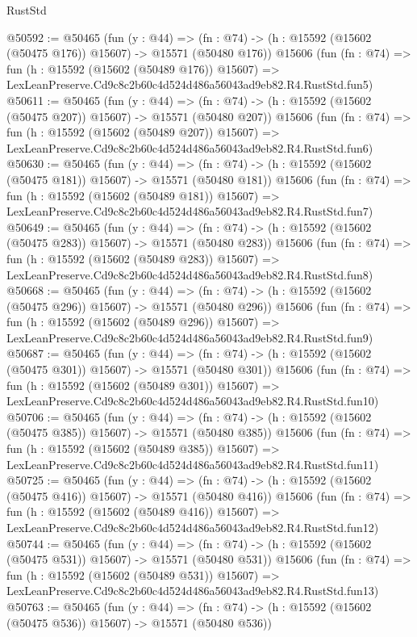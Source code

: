 \begin{lexlean}{RustStd}
\begin{coremodule}
@50592 := @50465
    (fun (y : @44) =>
    (fn : @74) -> (h : @15592 (@15602 (@50475 @176)) @15607) -> @15571 (@50480 @176))
    @15606
    (fun (fn : @74) =>
    fun (h : @15592 (@15602 (@50489 @176)) @15607) =>
    LexLeanPreserve.Cd9c8c2b60c4d524d486a56043ad9eb82.R4.RustStd.fun5)
@50611 := @50465
    (fun (y : @44) =>
    (fn : @74) -> (h : @15592 (@15602 (@50475 @207)) @15607) -> @15571 (@50480 @207))
    @15606
    (fun (fn : @74) =>
    fun (h : @15592 (@15602 (@50489 @207)) @15607) =>
    LexLeanPreserve.Cd9c8c2b60c4d524d486a56043ad9eb82.R4.RustStd.fun6)
@50630 := @50465
    (fun (y : @44) =>
    (fn : @74) -> (h : @15592 (@15602 (@50475 @181)) @15607) -> @15571 (@50480 @181))
    @15606
    (fun (fn : @74) =>
    fun (h : @15592 (@15602 (@50489 @181)) @15607) =>
    LexLeanPreserve.Cd9c8c2b60c4d524d486a56043ad9eb82.R4.RustStd.fun7)
@50649 := @50465
    (fun (y : @44) =>
    (fn : @74) -> (h : @15592 (@15602 (@50475 @283)) @15607) -> @15571 (@50480 @283))
    @15606
    (fun (fn : @74) =>
    fun (h : @15592 (@15602 (@50489 @283)) @15607) =>
    LexLeanPreserve.Cd9c8c2b60c4d524d486a56043ad9eb82.R4.RustStd.fun8)
@50668 := @50465
    (fun (y : @44) =>
    (fn : @74) -> (h : @15592 (@15602 (@50475 @296)) @15607) -> @15571 (@50480 @296))
    @15606
    (fun (fn : @74) =>
    fun (h : @15592 (@15602 (@50489 @296)) @15607) =>
    LexLeanPreserve.Cd9c8c2b60c4d524d486a56043ad9eb82.R4.RustStd.fun9)
@50687 := @50465
    (fun (y : @44) =>
    (fn : @74) -> (h : @15592 (@15602 (@50475 @301)) @15607) -> @15571 (@50480 @301))
    @15606
    (fun (fn : @74) =>
    fun (h : @15592 (@15602 (@50489 @301)) @15607) =>
    LexLeanPreserve.Cd9c8c2b60c4d524d486a56043ad9eb82.R4.RustStd.fun10)
@50706 := @50465
    (fun (y : @44) =>
    (fn : @74) -> (h : @15592 (@15602 (@50475 @385)) @15607) -> @15571 (@50480 @385))
    @15606
    (fun (fn : @74) =>
    fun (h : @15592 (@15602 (@50489 @385)) @15607) =>
    LexLeanPreserve.Cd9c8c2b60c4d524d486a56043ad9eb82.R4.RustStd.fun11)
@50725 := @50465
    (fun (y : @44) =>
    (fn : @74) -> (h : @15592 (@15602 (@50475 @416)) @15607) -> @15571 (@50480 @416))
    @15606
    (fun (fn : @74) =>
    fun (h : @15592 (@15602 (@50489 @416)) @15607) =>
    LexLeanPreserve.Cd9c8c2b60c4d524d486a56043ad9eb82.R4.RustStd.fun12)
@50744 := @50465
    (fun (y : @44) =>
    (fn : @74) -> (h : @15592 (@15602 (@50475 @531)) @15607) -> @15571 (@50480 @531))
    @15606
    (fun (fn : @74) =>
    fun (h : @15592 (@15602 (@50489 @531)) @15607) =>
    LexLeanPreserve.Cd9c8c2b60c4d524d486a56043ad9eb82.R4.RustStd.fun13)
@50763 := @50465
    (fun (y : @44) =>
    (fn : @74) -> (h : @15592 (@15602 (@50475 @536)) @15607) -> @15571 (@50480 @536))

\end{coremodule}
\end{lexlean}
